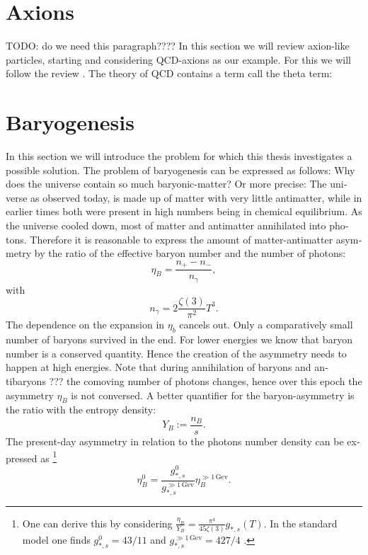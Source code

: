 \documentclass[master,       %
               twoside,        %
               BCOR10mm,       %
               english,ngerman, %
               ]{GAUBM}
\begin{document}
\begin{otherlanguage}{english}
\section{Axions}
TODO: do we need this paragraph????
In this section we will review axion-like particles, starting and considering QCD-axions as our example. For this we will follow the review \cite{Di_Luzio_2020_Landscape_of_QCD_Axion_models}.
The theory of QCD contains a term call the theta term:






\section{Baryogenesis}
In this section we will introduce the problem for which this thesis investigates a possible solution.
The problem of baryogenesis can be expressed as follows: Why does the universe contain so much baryonic-matter? Or more precise: The universe as observed today, is made up of matter with very little antimatter, while in earlier times both were present in high numbers being in chemical equilibrium. As the universe cooled down, most of matter and antimatter annihilated into photons. Therefore it is reasonable to express the amount of matter-antimatter asymmetry by the ratio of the effective baryon number and the number of photons:
\begin{equation}
	\eta_B = \frac{n_+ - n_-}{n_\gamma},
\end{equation}
with
\begin{equation}
	n_\gamma = 2 \frac{\zeta(3)}{\pi^2} T^3.
\end{equation}
The dependence on the expansion in $\eta_b$ cancels out.
Only a comparatively small number of baryons survived in the end.
For lower energies we know that baryon number is a conserved quantity. Hence the creation of the asymmetry needs to happen at high energies.
Note that during annihilation of baryons and antibaryons ??? the comoving number of photons changes, hence over this epoch the asymmetry $\eta_B$ is not conversed. A better quantifier for the baryon-asymmetry
is the ratio with the entropy density:
\begin{equation}
	\label{eq:baryon_abundance}
	Y_B := \frac{n_B}{s}.
\end{equation}
The present-day asymmetry in relation to the photons number density can be expressed as \footnote{
One can derive this by considering $\frac{\eta_B}{Y_B} = \frac{\pi^4}{45 \zeta(3)} g_{*, s}(T)$.
In the standard model one finds $g_{*,s}^0 = 43/11$ and $g_{*, s}^{\gg 1 \, \mathrm{Gev}} = 427/4$ \cite[sec. 3.4]{the_early_universe_kolb_and_turner}.
}
\begin{equation}
	\eta_B^0 = \frac{g_{*,s}^0}{g_{*, s}^{\gg 1 \, \mathrm{Gev}}} \eta_B^{\gg 1 \, \mathrm{Gev}}.
\end{equation}


\end{otherlanguage}
\end{document}
